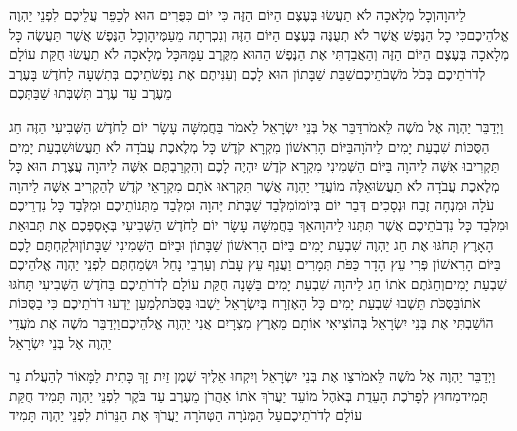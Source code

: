 \documentclass[../main/main.tex]{subfiles}
\begin{document}
\begin{multicols*}{\ncols}
לַיהוָה\PreVerseSpace{}וְכָל מְלָאכָה לֹא תַעֲשׂוּ בְּעֶצֶם הַיּוֹם הַזֶּה כִּי יוֹם כִּפֻּרִים הוּא לְכַפֵּר עֲלֵיכֶם לִפְנֵי יַהְוֶה אֱלֹהֵיכֶם\PreVerseSpace{}כִּי כָל הַנֶּפֶשׁ אֲשֶׁר לֹא תְעֻנֶּה בְּעֶצֶם הַיּוֹם הַזֶּה וְנִכְרְתָה מֵעַמֶּיהָ\PreVerseSpace{}וְכָל הַנֶּפֶשׁ אֲשֶׁר תַּעֲשֶׂה כָּל מְלָאכָה בְּעֶצֶם הַיּוֹם הַזֶּה וְהַאֲבַדְתִּי אֶת הַנֶּפֶשׁ הַהוּא מִקֶּרֶב עַמָּהּ\PreVerseSpace{}כָּל מְלָאכָה לֹא תַעֲשׂוּ חֻקַּת עוֹלָם לְדֹרֹתֵיכֶם בְּכֹל מֹשְׁבֹתֵיכֶם\PreVerseSpace{}שַׁבַּת שַׁבָּתוֹן הוּא לָכֶם וְעִנִּיתֶם אֶת נַפְשֹׁתֵיכֶם בְּתִשְׁעָה לַחֹדֶשׁ בָּעֶרֶב מֵעֶרֶב עַד עֶרֶב תִּשְׁבְּתוּ שַׁבַּתְּכֶם\OpenSection{}\par
{}וַיְדַבֵּר יַהְוֶה אֶל מֹשֶׁה לֵּאמֹר\PreVerseSpace{}דַּבֵּר אֶל בְּנֵי יִשְׂרָאֵל לֵאמֹר בַּחֲמִשָּׁה עָשָׂר יוֹם לַחֹדֶשׁ הַשְּׁבִיעִי הַזֶּה חַג הַסֻּכּוֹת שִׁבְעַת יָמִים לַיהֹוָה\PreVerseSpace{}בַּיּוֹם הָרִאשׁוֹן מִקְרָא קֹדֶשׁ כָּל מְלֶאכֶת עֲבֹדָה לֹא תַעֲשׂוּ\PreVerseSpace{}שִׁבְעַת יָמִים תַּקְרִיבוּ אִשֶּׁה לַיהוָה בַּיּוֹם הַשְּׁמִינִי מִקְרָא קֹדֶשׁ יִהְיֶה לָכֶם וְהִקְרַבְתֶּם אִשֶּׁה לַיהוָה עֲצֶרֶת הוּא כָּל מְלֶאכֶת עֲבֹדָה לֹא תַעֲשׂוּ\PreVerseSpace{}אֵלֶּה מוֹעֲדֵי יַהְוֶה אֲשֶׁר תִּקְרְאוּ אֹתָם מִקְרָאֵי קֹדֶשׁ לְהַקְרִיב אִשֶּׁה לַיהוָה עֹלָה וּמִנְחָה זֶבַח וּנְסָכִים דְּבַר יוֹם בְּיוֹמוֹ\PreVerseSpace{}מִלְּבַד שַׁבְּתֹת יְּהוָה וּמִלְּבַד מַתְּנוֹתֵיכֶם וּמִלְּבַד כָּל נִדְרֵיכֶם וּמִלְּבַד כָּל נִדְבֹתֵיכֶם אֲשֶׁר תִּתְּנוּ לַיהוָה\PreVerseSpace{}אַךְ בַּחֲמִשָּׁה עָשָׂר יוֹם לַחֹדֶשׁ הַשְּׁבִיעִי בְּאָסְפְּכֶם אֶת תְּבוּאַת הָאָרֶץ תָּחֹגּוּ אֶת חַג יַהְוֶה שִׁבְעַת יָמִים בַּיּוֹם הָרִאשׁוֹן שַׁבָּתוֹן וּבַיּוֹם הַשְּׁמִינִי שַׁבָּתוֹן\PreVerseSpace{}וּלְקַחְתֶּם לָכֶם בַּיּוֹם הָרִאשׁוֹן פְּרִי עֵץ הָדָר כַּפֹּת תְּמָרִים וַעֲנַף עֵץ עָבֹת וְעַרְבֵי נָחַל וּשְׂמַחְתֶּם לִפְנֵי יַהְוֶה אֱלֹהֵיכֶם שִׁבְעַת יָמִים\PreVerseSpace{}וְחַגֹּתֶם אֹתוֹ חַג לַיהוָה שִׁבְעַת יָמִים בַּשָּׁנָה חֻקַּת עוֹלָם לְדֹרֹתֵיכֶם בַּחֹדֶשׁ הַשְּׁבִיעִי תָּחֹגּוּ אֹתוֹ\PreVerseSpace{}בַּסֻּכֹּת תֵּשְׁבוּ שִׁבְעַת יָמִים כָּל הָאֶזְרָח בְּיִשְׂרָאֵל יֵשְׁבוּ בַּסֻּכֹּת\PreVerseSpace{}לְמַעַן יֵדְעוּ דֹרֹתֵיכֶם כִּי בַסֻּכּוֹת הוֹשַׁבְתִּי אֶת בְּנֵי יִשְׂרָאֵל בְּהוֹצִיאִי אוֹתָם מֵאֶרֶץ מִצְרָיִם אֲנִי יַהְוֶה אֱלֹהֵיכֶם\PreVerseSpace{}וַיְדַבֵּר מֹשֶׁה אֶת מֹעֲדֵי יַהְוֶה אֶל בְּנֵי יִשְׂרָאֵל\OpenSection{}\par
{}וַיְדַבֵּר יַהְוֶה אֶל מֹשֶׁה לֵּאמֹר\PreVerseSpace{}צַו אֶת בְּנֵי יִשְׂרָאֵל וְיִקְחוּ אֵלֶיךָ שֶׁמֶן זַיִת זָךְ כָּתִית לַמָּאוֹר לְהַעֲלֹת נֵר תָּמִיד\PreVerseSpace{}מִחוּץ לְפָרֹכֶת הָעֵדֻת בְּאֹהֶל מוֹעֵד יַעֲרֹךְ אֹתוֹ אַהֲרֹן מֵעֶרֶב עַד בֹּקֶר לִפְנֵי יַהְוֶה תָּמִיד חֻקַּת עוֹלָם לְדֹרֹתֵיכֶם\PreVerseSpace{}עַל הַמְּנֹרָה הַטְּהֹרָה יַעֲרֹךְ אֶת הַנֵּרוֹת לִפְנֵי יַהְוֶה תָּמִיד\OpenSection{}\par

\end{multicols*}
\end{document}
